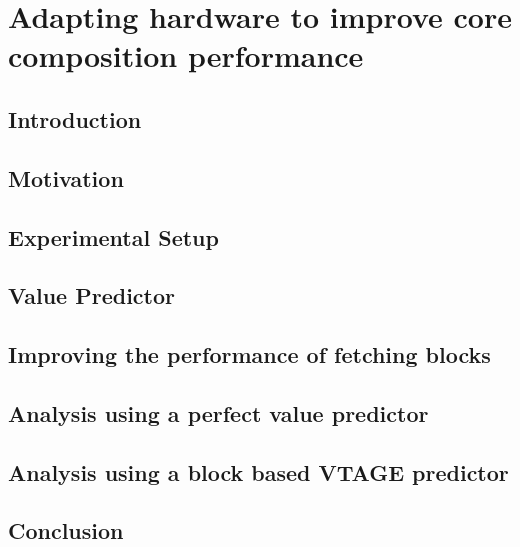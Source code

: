 \chapter{Adapting hardware to improve core composition performance}

\section{Introduction}\label{sect:introduction-chapter3}

\section{Motivation}\label{sect:ch3-motivation}

\section{Experimental Setup}
\label{chp:chp3:sec:exp}
\section{Value Predictor}

\section{Improving the performance of fetching blocks}\label{chp3:sec:fetch}

\section{Analysis using a perfect value predictor}
\label{chp:chp3:sec:analysis}
\section{Analysis using a block based VTAGE predictor}
\label{chp:chp3:sec:analysis}
\section{Conclusion}

%
%